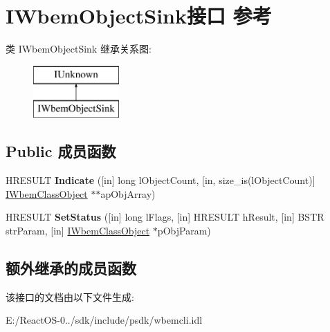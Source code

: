 \hypertarget{interface_i_wbem_object_sink}{}\section{I\+Wbem\+Object\+Sink接口 参考}
\label{interface_i_wbem_object_sink}
类 I\+Wbem\+Object\+Sink 继承关系图\+:\begin{figure}[H]
\begin{center}
\leavevmode
\includegraphics[height=2.000000cm]{interface_i_wbem_object_sink}
\end{center}
\end{figure}
\subsection*{Public 成员函数}
\begin{DoxyCompactItemize}
\item 
\mbox{\label{interface_i_wbem_object_sink_a26d8294cbc861ede50049a17f32ca093}} 
H\+R\+E\+S\+U\+LT {\bfseries Indicate} (\mbox{[}in\mbox{]} long l\+Object\+Count, \mbox{[}in, size\+\_\+is(l\+Object\+Count)\mbox{]} \hyperlink{interface_i_wbem_class_object}{I\+Wbem\+Class\+Object} $\ast$$\ast$ap\+Obj\+Array)
\item 
\mbox{\label{interface_i_wbem_object_sink_aa961e6c713d4e4f2d5dc613cd5df75f9}} 
H\+R\+E\+S\+U\+LT {\bfseries Set\+Status} (\mbox{[}in\mbox{]} long l\+Flags, \mbox{[}in\mbox{]} H\+R\+E\+S\+U\+LT h\+Result, \mbox{[}in\mbox{]} B\+S\+TR str\+Param, \mbox{[}in\mbox{]} \hyperlink{interface_i_wbem_class_object}{I\+Wbem\+Class\+Object} $\ast$p\+Obj\+Param)
\end{DoxyCompactItemize}
\subsection*{额外继承的成员函数}


该接口的文档由以下文件生成\+:\begin{DoxyCompactItemize}
\item 
E\+:/\+React\+O\+S-\/0../sdk/include/psdk/wbemcli.\+idl\end{DoxyCompactItemize}
